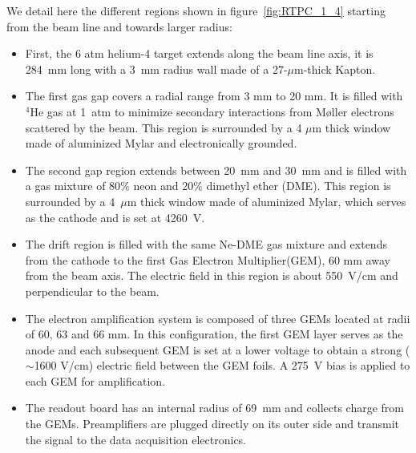 \documentclass[twocolumn,showpacs,superscriptaddress,groupedaddress]{revtex4}
\begin{document}
We detail here the different regions shown in figure~\ref{fig:RTPC_1_4} starting 
from the beam line and towards larger radius:\\
\begin{itemize}
   \item First, the 6 atm helium-4 target extends along the beam line axis, it 
      is 284~mm long with a 3~mm radius wall made of a 27-$\mu$m-thick Kapton.
   \item The first gas gap covers a radial range from 3 mm to 20 mm. It is 
      filled with $^{4}$He gas at 1~atm to minimize secondary interactions from
      M\o ller electrons scattered by the beam. This 
      region is surrounded by a 4 $\mu$m thick window made of aluminized Mylar 
      and electronically grounded.
   \item The second gap region extends between 20~mm and 30~mm and is filled with a 
      gas mixture of 80$\%$ neon and 20$\%$ dimethyl ether (DME). This region 
      is surrounded by a 4~$\mu$m thick window made of aluminized Mylar, which 
      serves as the cathode and is set at 4260~V.
   \item The drift region is filled with the same Ne-DME gas mixture and extends 
      from the cathode to the first Gas Electron Multiplier(GEM), 60 mm away 
      from the beam axis. The electric field in this region is about 550~V/cm 
      and perpendicular to the beam.
   \item The electron amplification system is composed of three GEMs located at 
      radii of 60, 63 and 66 mm. In this configuration, the first GEM layer 
      serves as the anode and each subsequent GEM is set at a lower voltage to
      obtain a strong ($\sim$1600 V/cm) electric field between the GEM foils. A 
      275~V bias is applied to each GEM for amplification.
   \item The readout board has an internal radius of 69~mm and collects charge
     from the GEMs. Preamplifiers are plugged directly on its outer side and
     transmit the signal to the data acquisition electronics.
\end{itemize}
\end{document}
